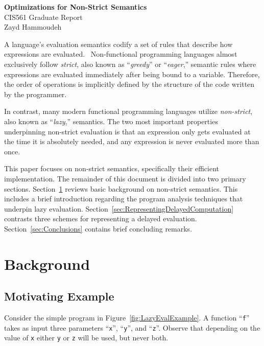 \documentclass[11pt]{article}
\begin{document}
\begin{center}
  \textbf{\Large Optimizations for Non-Strict Semantics}\\\vspace{3pt}
  {\large CIS561 Graduate Report}\\\vspace{3pt}
  Zayd Hammoudeh
\end{center}

A language's evaluation semantics codify a set of rules that describe how expressions are evaluated.~\cite{hoover:Notes}  Non-functional programming languages almost exclusively follow \textit{strict}, also known as ``\textit{greedy}'' or ``\textit{eager},'' semantic rules where expressions are evaluated immediately after being bound to a variable.  Therefore, the order of operations is implicitly defined by the structure of the code written by the programmer.

In contrast, many modern functional programming languages utilize \textit{non-strict}, also known as ``\textit{lazy},'' semantics. The two most important properties underpinning non-strict evaluation is that an expression only gets evaluated at the time it is absolutely needed, and any expression is never evaluated more than once.~\cite{Henderson:1976}

This paper focuses on non-strict semantics, specifically their efficient implementation. The remainder of this document is divided into two primary sections. Section~\ref{sec:Background} reviews basic background on non-strict semantics.  This includes a brief introduction regarding the program analysis techniques that underpin lazy evaluation.  Section~\ref{sec:RepresentingDelayedComputation} contrasts three schemes for representing a delayed evaluation. Section~\ref{sec:Conclusions} contains brief concluding remarks.

\section{Background}\label{sec:Background}

\subsection{Motivating Example}

Consider the simple program in Figure~\ref{fig:LazyEvalExample}.  A function ``\texttt{f}'' takes as input three parameters ``\texttt{x}'', ``\texttt{y}'', and ``\texttt{z}''.  Observe that depending on the value of \texttt{x} either \texttt{y} or \texttt{z} will be used, but never both.~\cite{Henderson:1976}
\end{document}
